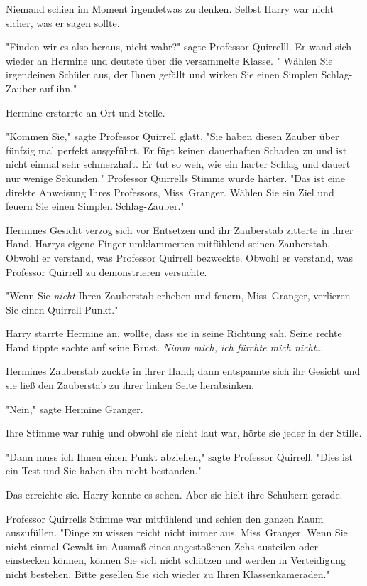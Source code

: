 {Niemand schien im Moment irgendetwas zu denken. Selbst Harry war nicht sicher, was er sagen sollte.

"Finden wir es also heraus, nicht wahr?" sagte Professor Quirrelll. Er wand sich wieder an Hermine und deutete über die versammelte Klasse. " Wählen Sie irgendeinen Schüler aus, der Ihnen gefällt und wirken Sie einen Simplen Schlag-Zauber auf ihn."

Hermine erstarrte an Ort und Stelle.

"Kommen Sie," sagte Professor Quirrell glatt. "Sie haben diesen Zauber über fünfzig mal perfekt ausgeführt. Er fügt keinen dauerhaften Schaden zu und ist nicht einmal sehr schmerzhaft. Er tut so weh, wie ein harter Schlag und dauert nur wenige Sekunden." Professor Quirrells Stimme wurde härter. "Das ist eine direkte Anweisung Ihres Professors, Miss~Granger. Wählen Sie ein Ziel und feuern Sie einen Simplen Schlag-Zauber."

Hermines Gesicht verzog sich vor Entsetzen und ihr Zauberstab zitterte in ihrer Hand. Harrys eigene Finger umklammerten mitfühlend seinen Zauberstab. Obwohl er verstand, was Professor Quirrell bezweckte. Obwohl er verstand, was Professor Quirrell zu demonstrieren versuchte.

"Wenn Sie \emph{nicht} Ihren Zauberstab erheben und feuern, Miss~Granger, verlieren Sie einen Quirrell-Punkt."

Harry starrte Hermine an, wollte, dass sie in seine Richtung sah. Seine rechte Hand tippte sachte auf seine Brust. \emph{Nimm mich, ich fürchte mich nicht…}

Hermines Zauberstab zuckte in ihrer Hand; dann entspannte sich ihr Gesicht und sie ließ den Zauberstab zu ihrer linken Seite herabsinken.

"Nein," sagte Hermine Granger.

Ihre Stimme war ruhig und obwohl sie nicht laut war, hörte sie jeder in der Stille.

"Dann muss ich Ihnen einen Punkt abziehen," sagte Professor Quirrell. "Dies ist ein Test und Sie haben ihn nicht bestanden."

Das erreichte sie. Harry konnte es sehen. Aber sie hielt ihre Schultern gerade.

Professor Quirrells Stimme war mitfühlend und schien den ganzen Raum auszufüllen. "Dinge zu wissen reicht nicht immer aus, Miss~Granger. Wenn Sie nicht einmal Gewalt im Ausmaß eines angestoßenen Zehs austeilen oder einstecken können, können Sie sich nicht schützen und werden in Verteidigung nicht bestehen. Bitte gesellen Sie sich wieder zu Ihren Klassenkameraden."

}

